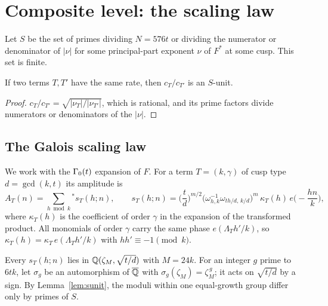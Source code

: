 \documentclass[11pt]{amsart}
\theoremstyle{definition}\newtheorem{definition}[theorem]{Definition}
\theoremstyle{remark}\newtheorem{remark}[theorem]{Remark}
\begin{document}
\section{Composite level: the scaling law}\label{sec:scaling}
Let $S$ be the set of primes dividing $N=576t$ or dividing the numerator or denominator of $|\nu|$ for some principal-part exponent $\nu$ of $F^\ast$ at some cusp. This set is finite.

\begin{lemma}\label{lem:sunit}
If two terms $T,T'$ have the same rate, then $c_T/c_{T'}$ is an $S$-unit.
\end{lemma}
\begin{proof}
$c_T/c_{T'}=\sqrt{|\nu_T|/|\nu_{T'}|}$, which is rational, and its prime factors divide numerators or denominators of the $|\nu|$.
\end{proof}

\subsection{The Galois scaling law}
We work with the $\Gamma_0(t)$ expansion of $F$. For a term $T=(k,\gamma)$ of cusp type $d=\gcd(k,t)$ its amplitude is
\begin{equation}\label{eq:model}
A_T(n)=\sum_{h\bmod k}{}^{*}s_T(h;n),\qquad
s_T(h;n)=\Big(\frac td\Big)^{m/2}\big(\omega_{h,k}^{-1}\omega_{th/d,\,k/d}\big)^{m}\,\kappa_T(h)\,e\Big(-\frac{hn}k\Big),
\end{equation}
where $\kappa_T(h)$ is the coefficient of order $\gamma$ in the expansion of the transformed product. All monomials of order $\gamma$ carry the same phase $e(\Lambda_T h'/k)$, so $\kappa_T(h)=\kappa_T\,e(\Lambda_Th'/k)$ with $hh'\equiv-1\pmod k$.

Every $s_T(h;n)$ lies in $\mathbb Q(\zeta_{M},\sqrt{t/d})$ with $M=24k$. For an integer $g$ prime to $6tk$, let $\sigma_g$ be an automorphism of $\overline{\mathbb Q}$ with $\sigma_g(\zeta_M)=\zeta_M^{\,g}$; it acts on $\sqrt{t/d}$ by a sign. By Lemma~\ref{lem:sunit}, the moduli within one equal-growth group differ only by primes of $S$.
\end{document}
